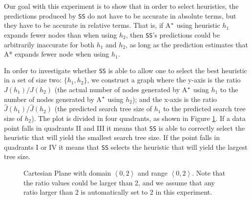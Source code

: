 Our goal with this experiment is to show that in order to select heuristics, the predictions produced by \texttt{SS} do not have to be accurate in absolute terms, but they have to be accurate in relative terms. That is, if A$\sp{*}$ using heuristic $h_{1}$ expands fewer nodes than when using $h_{2}$, then \texttt{SS}'s predictions could be arbitrarily inaccurate for both $h_{1}$ and $h_{2}$, as long as the prediction estimates that A* expands fewer node when using $h_{1}$. %

In order to investigate whether \texttt{SS} is able to allow one to select the best heuristic in a set of size two: $\{h_{1}, h_{2}\}$, we construct a graph where the y-axis is the ratio $J(h_{1})/J(h_{2})$ (the actual number of nodes generated by A$\sp{*}$ using $h_{1}$ to the number of nodes generated by A$\sp{*}$ using $h_{2}$); and the x-axis is the ratio $\hat{J}(h_{1})/\hat{J}(h_{2})$ (the predicted search tree size of $h_{1}$ to the predicted search tree size of $h_{2}$). 
%
The plot is divided in four quadrants, as shown in Figure \ref{fig:img_cartesian_plane}. If a data point falls in quadrants II and III it means that \texttt{SS} is able to correctly select the heuristic that will 
yield the smallest search tree size. 
If the point falls in quadrants I or IV it means that \texttt{SS} selects the heuristic that will yield the largest tree size. 

\pagestyle{empty}

\begin{figure}[!thb]
\centering  
{}
  \caption{Cartesian Plane with domain $\left\langle 0, 2\right\rangle$ and range $\left\langle 0, 2\right\rangle$. Note that the ratio values could be larger than 2, and we assume that any ratio larger than 2 is automatically set to 2 in this experiment.}\label{fig:img_cartesian_plane}
\end{figure}


